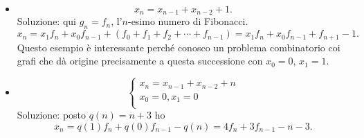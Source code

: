\documentclass{article}[12]
\begin{document}
\begin{itemize}
\item 
$$
x_n = x_{n-1} + x_{n-2} + 1.
$$
Soluzione: qui $g_n=f_n$, l'$n$-esimo numero di Fibonacci. 
$$
x_n = x_1 f_n + x_0 f_{n-1} + (f_0 + f_1 + f_2 + \cdots + f_{n-1})
    = x_1 f_n + x_0 f_{n-1} + f_{n+1} - 1.
$$
Questo esempio \`e interessante perch\'e conosco un problema
combinatorio coi grafi che d\`a 
origine precisamente a questa successione con $x_0=0$, $x_1=1$. 

\item 
$$
\left\{
\begin{array}{l}
x_n = x_{n-1} + x_{n-2} + n \\
x_0 = 0, x_1 = 0            \\
\end{array}
\right.
$$
Soluzione: posto $q(n)=n+3$ ho 
$$
x_n = q(1) f_n + q(0) f_{n-1} - q(n) = 4f_n + 3f_{n-1} - n - 3.
$$


\end{itemize}
\end{document}
